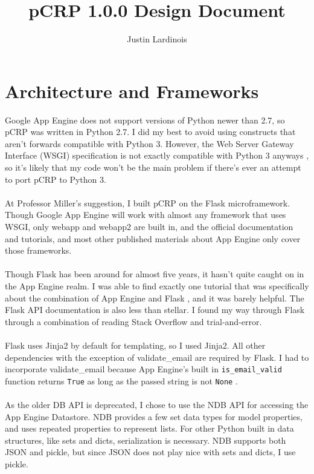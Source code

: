\documentclass[12pt]{article}
\title{pCRP 1.0.0 Design Document}
\author{Justin Lardinois}
\date{}
\begin{document}
\maketitle

\section{Architecture and Frameworks}
	Google App Engine does not support versions of Python newer than 2.7, so
	pCRP was written in Python 2.7. I did my best to avoid using constructs
	that aren't forwards compatible with Python 3. However, the Web Server
	Gateway Interface (WSGI) specification is not exactly compatible with
	Python 3 anyways \cite{python3}, so it's likely that my code won't be
	the main problem if there's ever an attempt to port pCRP to Python 3.
	\\\\
	At Professor Miller's suggestion, I built pCRP on the Flask
	microframework. Though Google App Engine will work with almost any
	framework that uses WSGI, only webapp and webapp2 are built in, and
	the official documentation and tutorials, and most other published
	materials about App Engine only cover those frameworks.
	\\\\
	Though Flask has been around for almost five years, it hasn't quite
	caught on in the App Engine realm. I was able to find exactly one
	tutorial that was specifically about the combination of App Engine
	and Flask \cite{souza}, and it was barely helpful. The Flask API
	documentation \cite{flask} is also less than stellar. I found my
	way through Flask through a combination of reading Stack Overflow
	and trial-and-error.
	\\\\
	Flask uses Jinja2 by default for templating, so I used Jinja2. All
	other dependencies with the exception of validate{\_}email are required
	by Flask. I had to incorporate validate{\_}email because App Engine's
	built in \texttt{is{\_}email{\_}valid} function returns \texttt{True} as
	long as the passed string is not \texttt{None} \cite{email}.
	\\\\
	As the older DB API is deprecated, I chose to use the NDB API for
	accessing the App Engine Datastore. NDB provides a few set data types
	for model properties, and uses repeated properties to represent lists.
	For other Python built in data structures, like sets and dicts,
	serialization is necessary. NDB supports both JSON and pickle, but
	since JSON does not play nice with sets and dicts, I use pickle.
\end{document}
